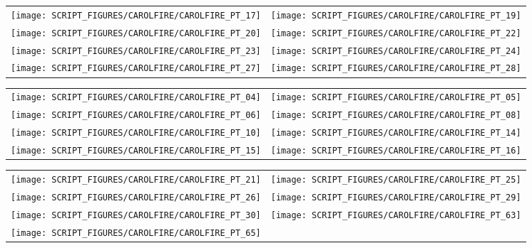 \begin{figure}[!ht]
\begin{tabular*}{\textwidth}{l@{\extracolsep{\fill}}r}
\texttt{[image: SCRIPT\_FIGURES/CAROLFIRE/CAROLFIRE\_PT\_17]} &
\texttt{[image: SCRIPT\_FIGURES/CAROLFIRE/CAROLFIRE\_PT\_19]} \\
\texttt{[image: SCRIPT\_FIGURES/CAROLFIRE/CAROLFIRE\_PT\_20]} &
\texttt{[image: SCRIPT\_FIGURES/CAROLFIRE/CAROLFIRE\_PT\_22]} \\
\texttt{[image: SCRIPT\_FIGURES/CAROLFIRE/CAROLFIRE\_PT\_23]} &
\texttt{[image: SCRIPT\_FIGURES/CAROLFIRE/CAROLFIRE\_PT\_24]} \\
\texttt{[image: SCRIPT\_FIGURES/CAROLFIRE/CAROLFIRE\_PT\_27]} &
\texttt{[image: SCRIPT\_FIGURES/CAROLFIRE/CAROLFIRE\_PT\_28]}
\end{tabular*}
\label{CAROLFIRE_Thermoset_2}
\end{figure}

\begin{figure}[!ht]
\begin{tabular*}{\textwidth}{l@{\extracolsep{\fill}}r}
\texttt{[image: SCRIPT\_FIGURES/CAROLFIRE/CAROLFIRE\_PT\_04]} &
\texttt{[image: SCRIPT\_FIGURES/CAROLFIRE/CAROLFIRE\_PT\_05]} \\
\texttt{[image: SCRIPT\_FIGURES/CAROLFIRE/CAROLFIRE\_PT\_06]} &
\texttt{[image: SCRIPT\_FIGURES/CAROLFIRE/CAROLFIRE\_PT\_08]} \\
\texttt{[image: SCRIPT\_FIGURES/CAROLFIRE/CAROLFIRE\_PT\_10]} &
\texttt{[image: SCRIPT\_FIGURES/CAROLFIRE/CAROLFIRE\_PT\_14]} \\
\texttt{[image: SCRIPT\_FIGURES/CAROLFIRE/CAROLFIRE\_PT\_15]} &
\texttt{[image: SCRIPT\_FIGURES/CAROLFIRE/CAROLFIRE\_PT\_16]}
\end{tabular*}
\label{CAROLFIRE_Thermoplastic_1}
\end{figure}

\begin{figure}[!ht]
\begin{tabular*}{\textwidth}{l@{\extracolsep{\fill}}r}
\texttt{[image: SCRIPT\_FIGURES/CAROLFIRE/CAROLFIRE\_PT\_21]} &
\texttt{[image: SCRIPT\_FIGURES/CAROLFIRE/CAROLFIRE\_PT\_25]} \\
\texttt{[image: SCRIPT\_FIGURES/CAROLFIRE/CAROLFIRE\_PT\_26]} &
\texttt{[image: SCRIPT\_FIGURES/CAROLFIRE/CAROLFIRE\_PT\_29]} \\
\texttt{[image: SCRIPT\_FIGURES/CAROLFIRE/CAROLFIRE\_PT\_30]} &
\texttt{[image: SCRIPT\_FIGURES/CAROLFIRE/CAROLFIRE\_PT\_63]} \\
\texttt{[image: SCRIPT\_FIGURES/CAROLFIRE/CAROLFIRE\_PT\_65]}
\end{tabular*}
\label{CAROLFIRE_Thermoplastic_2}
\end{figure}

